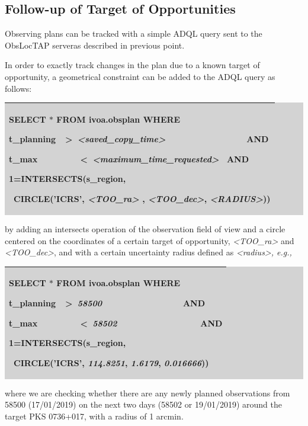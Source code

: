 \documentclass[11pt,a4paper]{ivoa}
\begin{document}
\subsection{Follow-up of Target of Opportunities}
Observing plans can be tracked with a simple ADQL query sent to the ObsLocTAP serveras described in previous point.
\par

In order to exactly track changes in the plan due to a known target of opportunity, a geometrical constraint can be added to the ADQL query as follows:

\bigskip
\par
\begingroup\setlength{\fboxsep}{0pt}
\colorbox{lightgray}{%
\begin{tabular}{|p{5.53in}|}
\hline
SELECT $\ast$  FROM ivoa.obsplan WHERE  \par  t\_planning\ \ >\   \textit{<saved\_copy\_time>}\ \ \ \ \ \ \ \ \ \ \ \ \ \ \ \ \  AND  \par  t\_max\ \ \ \ \ \ \ \ \ <\   \textit{<maximum\_time\_requested> }\  AND \par  1=INTERSECTS(s\_region, \par \  CIRCLE('ICRS', \textit{<TOO\_ra>} , \textit{<TOO\_dec>}, \textit{<RADIUS>})) \\
\hline
\end{tabular}%
}\endgroup
\par
\bigskip

by adding an intersects operation of the observation field of view and a circle centered on the coordinates of a certain target of opportunity, \textit{<TOO\_ra>} and \textit{<TOO\_dec>}, and with a certain uncertainty radius defined as \textit{<radius>, e.g.,}

\bigskip
\par
\begingroup\setlength{\fboxsep}{0pt}
\colorbox{lightgray}{%
\begin{tabular}{|p{5.53in}|}
\hline
SELECT $\ast$  FROM ivoa.obsplan WHERE  \par  t\_planning\ \ >\   \textit{58500}\ \ \ \ \ \ \ \ \ \ \ \ \ \ \ \ \  AND  \par  t\_max\ \ \ \ \ \ \ \ \ <\   \textit{58502\ \ \ \ \ \ \ \ \ \ \ \ \ \ \ \ \  }AND \par  1=INTERSECTS(s\_region, \par \  CIRCLE('ICRS', \textit{114.8251}, \textit{1.6179}, \textit{0.016666})) \\
\hline
\end{tabular}%
}\endgroup
\par
\bigskip
where we are checking whether there are any newly planned observations from 58500 (17/01/2019) on the next two days (58502 or 19/01/2019) around the target PKS 0736+017, with a radius of 1 arcmin.
\par
\end{document}
